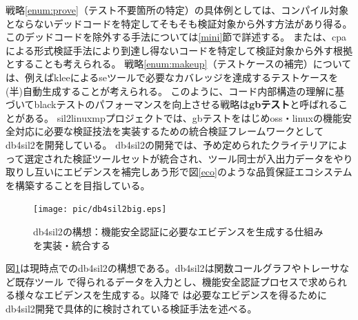 \par
戦略\ref{enum:prove}（テスト不要箇所の特定）の具体例としては、コンパイル対象とならないデッドコードを特定してそもそも検証対象から外す方法があり得る。
このデッドコードを除外する手法については\ref{mini}節で詳述する。
または、\acrshort{cpa}による形式検証手法により到達し得ないコードを特定して検証対象から外す根拠とすることも考えられる。
戦略\ref{enum:makeup}（テストケースの補完）については、例えば\acrshort{klee}による\acrshort{se}ツールで必要なカバレッジを達成するテストケースを(半)自動生成することが考えられる。
このように、コード内部構造の理解に基づいて\acrshort{black}テストのパフォーマンスを向上させる戦略は\textbf{\acrshort{gb}テスト}と呼ばれることがある。
\acrshort{sil2linuxmp}プロジェクトでは、\acrshort{gb}テストをはじめ\acrshort{oss}・\acrshort{linux}の機能安全対応に必要な検証技法を実装するための統合検証フレームワークとして\gls{db4sil2}を開発している。
\acrshort{db4sil2}の開発では、予め定められたクライテリアによって選定された検証ツールセットが統合され、ツール同士が入出力データをやり取りし互いにエビデンスを補完しあう形で図\ref{eco}のような品質保証エコシステムを構築することを目指している。
\begin{figure}[ht]
  \centering
  \texttt{[image: pic/db4sil2big.eps]}
  \caption{\acrshort{db4sil2}の構想：機能安全認証に必要なエビデンスを生成する仕組みを実装・統合する}
  \label{db4sil2big}
\end{figure}
\par
図\ref{db4sil2big}は現時点での\acrshort{db4sil2}の構想である。\acrshort{db4sil2}は関数コールグラフやトレーサなど既存ツール
で得られるデータを入力とし、機能安全認証プロセスで求められる様々なエビデンスを生成する。以降で
は必要なエビデンスを得るために\acrshort{db4sil2}開発で具体的に検討されている検証手法を述べる。
